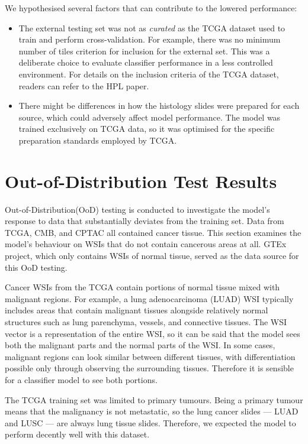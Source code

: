 \documentclass{l4proj}
\begin{document}
We hypothesised several factors that can contribute to the lowered performance:
\begin{itemize}
    \item The external testing set was not as \emph{curated} as the TCGA dataset used to train and perform cross-validation. For example, there was no minimum number of tiles criterion for inclusion for the external set. This was a deliberate choice to evaluate classifier performance in a less controlled environment. For details on the inclusion criteria of the TCGA dataset, readers can refer to the HPL paper.
    \item There might be differences in how the histology slides were prepared for each source, which could adversely affect model performance. The model was trained exclusively on TCGA data, so it was optimised for the specific preparation standards employed by TCGA.
\end{itemize}

\section{Out-of-Distribution Test Results} \label{sec:ood-results}

Out-of-Distribution(OoD) testing is conducted to investigate the model's response to data that substantially deviates from the training set. Data from TCGA, CMB, and CPTAC all contained cancer tissue. This section examines the model's behaviour on WSIs that do not contain cancerous areas at all. GTEx project, which only contains WSIs of normal tissue, served as the data source for this OoD testing.

Cancer WSIs from the TCGA contain portions of normal tissue mixed with malignant regions. For example, a lung adenocarcinoma (LUAD) WSI typically includes areas that contain malignant tissues alongside relatively normal structures such as lung parenchyma, vessels, and connective tissues. The WSI vector is a representation of the entire WSI, so it can be said that the model sees both the malignant parts and the normal parts of the WSI. In some cases, malignant regions can look similar between different tissues, with differentiation possible only through observing the surrounding tissues. Therefore it is sensible for a classifier model to see both portions.

The TCGA training set was limited to primary tumours. Being a primary tumour means that the malignancy is not metastatic, so the lung cancer slides --- LUAD and LUSC --- are always lung tissue slides. Therefore, we expected the model to perform decently well with this dataset.
\end{document}
